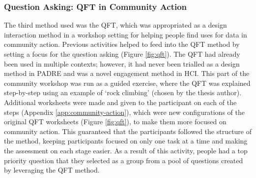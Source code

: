 \subsubsection[Question Asking]{Question Asking: QFT in Community Action}
\label{sub:qft_action}
The third method used was the QFT, which was appropriated as a design interaction method in a workshop setting for helping people find uses for data in community action. Previous activities helped to feed into the QFT method by setting a focus for the question asking (Figure \ref{fig:qft}). The QFT had already been used in multiple contexts; however, it had never been trialled as a design method in PADRE and was a novel engagement method in HCI. This part of the community workshop was run as a guided exercise, where the QFT was explained step-by-step using an example of `rock climbing' (chosen by the thesis author). Additional worksheets were made and given to the participant on each of the steps (Appendix \ref{app:community-action}), which were new configurations of the original QFT worksheets (Figure \ref{fig:qft}), to make them more focused on community action. This guaranteed that the participants followed the structure of the method, keeping participants focused on only one task at a time and making the assessment on each stage easier. As a result of this activity, people had a top priority question that they selected as a group from a pool of questions created by leveraging the QFT method.

